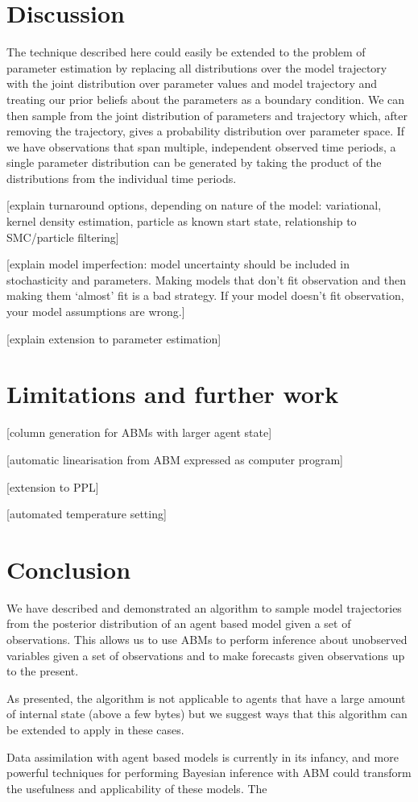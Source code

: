 \documentclass{article}
\begin{document}
\section{Discussion} 
\label{discussion}
 The technique described here could easily be extended to the problem of parameter estimation by replacing all distributions over the model trajectory with the joint distribution over parameter values and model trajectory and treating our prior beliefs about the parameters as a boundary condition. We can then sample from the joint distribution of parameters and trajectory which, after removing the trajectory, gives a probability distribution over parameter space. If we have observations that span multiple, independent observed time periods, a single parameter distribution can be generated by taking the product of the distributions from the individual time periods.
 
[explain turnaround options, depending on nature of the model: variational, kernel density estimation, particle as known start state, relationship to SMC/particle filtering]

[explain model imperfection: model uncertainty should be included in stochasticity and parameters. Making models that don't fit observation and then making them `almost' fit is a bad strategy. If your model doesn't fit observation, your model assumptions are wrong.]

[explain extension to parameter estimation]

\section{Limitations and further work}

[column generation for ABMs with larger agent state]

[automatic linearisation from ABM expressed as computer program]

[extension to PPL]

[automated temperature setting]

\section{Conclusion}

We have described and demonstrated an algorithm to sample model trajectories from the posterior distribution of an agent based model given a set of observations. This allows us to use ABMs to perform inference about unobserved variables given a set of observations and to make forecasts given observations up to the present.

As presented, the algorithm is not applicable to agents that have a large amount of internal state (above a few bytes) but we suggest ways that this algorithm can be extended to apply in these cases.

Data assimilation with agent based models is currently in its infancy, and more powerful techniques for performing Bayesian inference with ABM could transform the usefulness and applicability of these models. The 

%
% 


\end{document}
